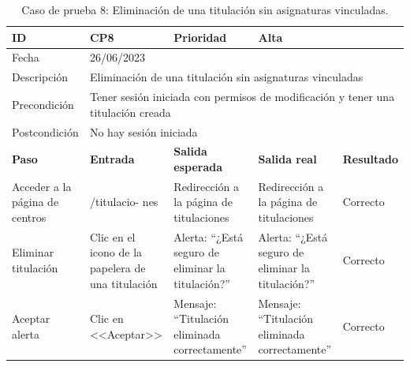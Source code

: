 \begin{table}[H]
\begin{tabular}{p{} p{} p{} p{} p{}}
\cellcolor{gray!25}
ID   & CP8 & \cellcolor{gray!25} Prioridad   & Alta \\ \hline
\cellcolor{gray!25} Fecha	&	\multicolumn{4}{l}{26/06/2023} \\ \hline
\cellcolor{gray!25} Descripción		&	\multicolumn{4}{p{.66\textwidth}}{Eliminación de una titulación sin asignaturas vinculadas} \\ \hline                                            
\cellcolor{gray!25}
Precondición  & \multicolumn{4}{p{.66\textwidth}}{Tener sesión iniciada con permisos de modificación y tener una titulación creada} \\ \hline
\cellcolor{gray!25} Postcondición & \multicolumn{4}{l}{No hay sesión iniciada}                                                    \\ \hline
\rowcolor{gray!25}
\textbf{Paso}   & \textbf{Entrada} & \textbf{Salida esperada} & \textbf{Salida real} & \textbf{Resultado} \\ \hline
Acceder a la página de centros 
& /titulacio-
nes                                                                           
& Redirección a la página de titulaciones                                   
& Redirección a la página de titulaciones                                   
& Correcto                            
\\ \hline
Eliminar titulación
& Clic en el icono de la papelera de una titulación
& Alerta: ``¿Está seguro de eliminar la titulación?''
& Alerta: ``¿Está seguro de eliminar la titulación?''
& Correcto
\\ \hline
Aceptar alerta
& Clic en <<Aceptar>>
& Mensaje: ``Titulación eliminada correctamente''                            
& Mensaje: ``Titulación eliminada correctamente''
& Correcto                            
\\ \hline                
\end{tabular}
\caption{Caso de prueba 8: Eliminación de una titulación sin asignaturas vinculadas.}
\end{table}

